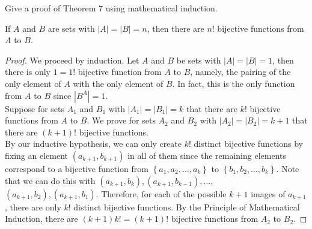 \documentclass[12pt]{article}
\newcommand{\Abs}[1]{\left\vert #1 \right\vert}
\newenvironment{problem}[2][Problem]{\begin{trivlist} \item[\hskip \labelsep {\bfseries #1}\hskip \labelsep {\bfseries #2.}]}{\end{trivlist}}
\newenvironment{solution}[1][Solution]{\begin{trivlist} \item[\hskip \labelsep {\bfseries #1}]}{\end{trivlist}}
\begin{document}
    \begin{problem}{34}
      Give a proof of Theorem 7 using mathematical induction.
    \begin{solution}
      If $A$ and $B$ are sets with $|A|=|B|=n$, then there are $n!$ bijective functions from $A$ to $B$. 
    \begin{proof}
      We proceed by induction. Let $A$ and $B$ be sets with $|A|=|B|=1$, then there is only $1=1!$ bijective function from $A$ to $B$, namely, the pairing of the only element of $A$ with the only element of $B$. In fact, this is the only function from $A$ to $B$ since $\Abs{B^{A}} = 1$. \\
      Suppose for sets $A_{1}$ and $B_{1}$ with $|A_{1}| = |B_{1}|=k$ that there are $k!$ bijective functions from $A$ to $B$. We prove for sets $A_{2}$ and $B_{2}$ with $|A_{2}|=|B_{2}|=k+1$ that there are $(k+1)!$ bijective functions.\\
      By our inductive hypothesis, we can only create $k!$ distinct bijective functions by fixing an element $(a_{k+1}, b_{k+1})$ in all of them since the remaining elements correspond to a bijective function from $\left\{ a_{1},a_{2},\dots,a_{k} \right\}$ to $\left\{ b_{1},b_{2},\dots,b_{k} \right\}$.  Note that we can do this with $(a_{k+1},b_{k}),(a_{k+1},b_{k-1}),\dots,$ $(a_{k+1},b_{2}),(a_{k+1},b_{1})$. Therefore, for each of the possible $k+1$ images of $a_{k+1}$, there are only $k!$ distinct bijective functions. By the Principle of Mathematical Induction,  there are $(k+1)k! = (k+1)!$ bijective functions from $A_{2}$ to $B_{2}$. 
    \end{proof}
    \end{solution}
    \end{problem}
       
\end{document}
